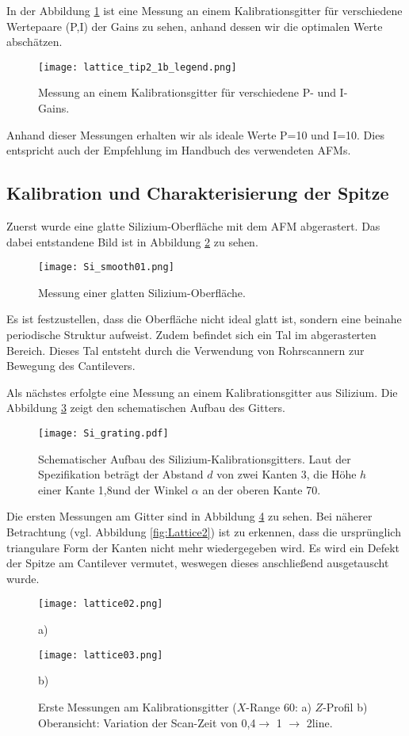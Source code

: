 In der Abbildung \ref{fig:gain} ist eine Messung an einem Kalibrationsgitter für verschiedene Wertepaare (P,I) der Gains zu sehen, anhand dessen wir die optimalen Werte abschätzen.
\begin{figure}[h]
	\centering
	\texttt{[image: lattice\_tip2\_1b\_legend.png]}
	\caption[Bestimmung des P- und I-Gains]{Messung an einem Kalibrationsgitter für verschiedene P- und I-Gains.}
\label{fig:gain}
\end{figure}
Anhand dieser Messungen erhalten wir als ideale Werte P=10 und I=10. Dies entspricht auch der Empfehlung im Handbuch des verwendeten AFMs.
\subsection{Kalibration und Charakterisierung der Spitze}
Zuerst wurde eine glatte Silizium-Oberfläche mit dem AFM abgerastert. Das dabei entstandene Bild ist in Abbildung \ref{fig:Si_smooth01} zu sehen.
\begin{figure}[h]
	\centering
	\texttt{[image: Si\_smooth01.png]}
	\caption{Messung einer glatten Silizium-Oberfläche.}
	\label{fig:Si_smooth01}
\end{figure}
Es ist festzustellen, dass die Oberfläche nicht ideal glatt ist, sondern eine beinahe periodische Struktur aufweist. Zudem befindet sich ein Tal im abgerasterten Bereich. Dieses Tal entsteht durch die Verwendung von Rohrscannern zur Bewegung des Cantilevers.

Als nächstes erfolgte eine Messung an einem Kalibrationsgitter aus Silizium. Die Abbildung \ref{fig:Si_grating} zeigt den schematischen Aufbau des Gitters.
\begin{figure}[H]
	\centering
	\texttt{[image: Si\_grating.pdf]}
	\caption[Schematischer Aufbau des Silizium-Kalibrationsgitters]{Schematischer Aufbau des Silizium-Kalibrationsgitters. Laut der Spezifikation beträgt der Abstand $d$ von zwei Kanten 3\micro\metre, die Höhe $h$ einer Kante 1,8\micro\metre und der Winkel $\alpha$ an der oberen Kante 70\degree.}
	\label{fig:Si_grating}
\end{figure}
Die ersten Messungen am Gitter sind in Abbildung \ref{fig:Lattice1} zu sehen. Bei näherer Betrachtung (vgl. Abbildung \ref{fig:Lattice2}) ist zu erkennen, dass die ursprünglich triangulare Form der Kanten nicht mehr wiedergegeben wird. Es wird ein Defekt der Spitze am Cantilever vermutet, weswegen dieses anschließend ausgetauscht wurde.
\begin{figure}[H]
	\centering
\begin{minipage}{0.45\textwidth}
\centering
		\texttt{[image: lattice02.png]}
		\caption*{a)}
	\end{minipage}
	\hfill
\begin{minipage}{0.45\textwidth}
\centering
		\texttt{[image: lattice03.png]}
		\caption*{b)}
	\end{minipage}
	\caption[Erste Messungen am Kalibrationsgitter]{Erste Messungen am Kalibrationsgitter ($X$-Range 60\micro\metre: a) $Z$-Profil b) Oberansicht: Variation der Scan-Zeit von 0,4$\rightarrow$ 1 $\rightarrow$ 2\second\per line.}
	\label{fig:Lattice1}
\end{figure}

